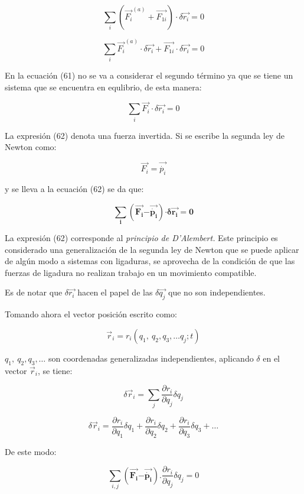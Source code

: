 \documentclass[]{article}
\begin{document}
\[\sum_{i}^{}{\left( {\overrightarrow{F_{i}}}^{(a)} + \overrightarrow{F_{1i}} \right) \cdot \delta\overrightarrow{r_{i}} = 0}\]

\[\sum_{i}^{}{{\overrightarrow{F_{i}}}^{(a)} \cdot \delta\overrightarrow{r_{i}} + \overrightarrow{F_{1i}} \cdot \delta\overrightarrow{r_{i}} = 0}\]

En la ecuación (61) no se va a considerar el segundo término ya que se
tiene un sistema que se encuentra en equlibrio, de esta manera:

\[\sum_{i}^{}{\overrightarrow{F_{i}} \cdot \delta\overrightarrow{r_{i}} = 0}\]

La expresión (62) denota una fuerza invertida. Si se escribe la segunda
ley de Newton como:

\[\overrightarrow{F_{i}} = \overrightarrow{\dot{p_{i}}}\]

y se lleva a la ecuación (62) se da que:

\[\sum_{\mathbf{i}}^{}{\left( \overrightarrow{\mathbf{F}_{\mathbf{i}}}\mathbf{-}\overrightarrow{\dot{\mathbf{p}_{\mathbf{i}}}} \right)\mathbf{\cdot \delta}\overrightarrow{\mathbf{r}_{\mathbf{i}}}\mathbf{= 0}}\]

La expresión (62) corresponde al \emph{principio de D'Alembert.} Este
principio es considerado una generalización de la segunda ley de Newton
que se puede aplicar de algún modo a sistemas con ligaduras, se
aprovecha de la condición de que las fuerzas de ligadura no realizan
trabajo en un movimiento compatible.

Es de notar que \(\delta\overrightarrow{r_{i}}\) hacen el papel de las
\(\delta\overrightarrow{q_{j}}\) que no son independientes.

Tomando ahora el vector posición escrito como:

\[{\overrightarrow{r}}_{i} = r_{i}\left( q_{1},\ q_{2},q_{3},\ldots q_{j};t \right)\]

\(q_{1},\ q_{2},q_{3},\ldots\) son coordenadas generalizadas
independientes, aplicando \(\delta\) en el vector
\({\overrightarrow{r}}_{i}\), se tiene:

\[\delta{\overrightarrow{r}}_{i} = \sum_{j}^{}\frac{\partial r_{i}}{\partial q_{j}}\delta q_{j}\]

\[\delta{\overrightarrow{r}}_{i} = \frac{\partial r_{i}}{\partial q_{1}}\delta q_{1} + \frac{\partial r_{i}}{\partial q_{2}}\delta q_{2} + \frac{\partial r_{i}}{\partial q_{3}}\delta q_{3} + \ldots\]

De este modo:

\[\sum_{i,j}^{}{\left( \overrightarrow{\mathbf{F}_{\mathbf{i}}}\mathbf{-}\overrightarrow{\dot{\mathbf{p}_{\mathbf{i}}}} \right).\frac{\partial r_{i}}{\partial q_{j}}}\delta q_{j} = 0\]
\end{document}
